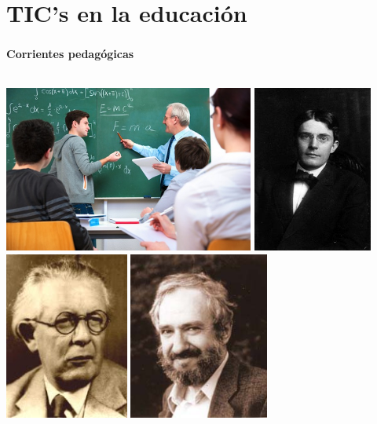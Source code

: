 \section{TIC's en la educación}
\setcounter{sectiontotal}{3}

\begin{frame}
    \frametitle{\pagetitle}
    \framesubtitle{Corrientes pedagógicas}

    \pause{}
\begin{columns}
 \hspace{0.5cm}
\begin{overprint}
     \includegraphics[width=\textwidth, height=5.5cm]{imagenes/instruccionismo} 
     \includegraphics[width=\textwidth, height=5.5cm]{imagenes/conductismo} 
     \includegraphics[width=\textwidth, height=5.5cm]{imagenes/constructivismo} 
     \includegraphics[width=\textwidth, height=5.5cm]{imagenes/construccionismo} 
\end{overprint}


\end{columns}
\end{frame}
